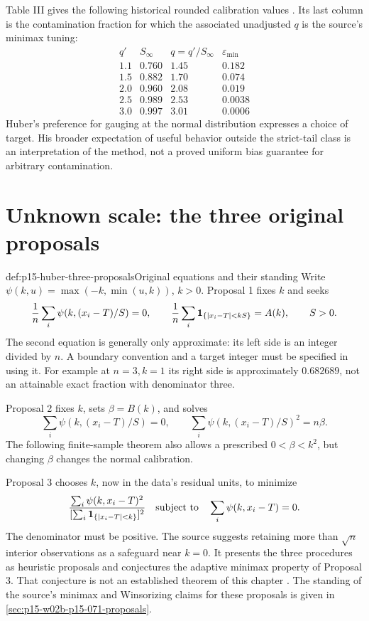 Table III gives the following historical rounded calibration values
\cite[p.~95]{Huber1964RobustLocation}. Its last column is the
contamination fraction for which the associated unadjusted \(q\)
is the source's minimax tuning:
\[
\begin{array}{c|rrr}
q'&S_\infty&q=q'/S_\infty&\varepsilon_{\min}\\\hline
1.1&0.760&1.45&0.182\\
1.5&0.882&1.70&0.074\\
2.0&0.960&2.08&0.019\\
2.5&0.989&2.53&0.0038\\
3.0&0.997&3.01&0.0006
\end{array}
\]
Huber's preference for gauging at the normal distribution expresses
a choice of target. His broader expectation of useful behavior
outside the strict-tail class is an interpretation of the method,
not a proved uniform bias guarantee for arbitrary contamination.

\section{Unknown scale: the three original proposals}
\label{sec:p15-huber-joint-proposals}

\begin{hbmethod}{def:p15-huber-three-proposals}{Original equations and their standing}
Write \(\psi(k,u)=\max(-k,\min(u,k))\), \(k>0\).
Proposal 1 fixes \(k\) and seeks
\[
 \frac1n\sum_i\psi(k,(x_i-T)/S)=0,\qquad
 \frac1n\sum_i{\bf1}_{\{|x_i-T|<kS\}}=A(k),\qquad S>0.
\]
The second equation is generally only approximate: its left side
is an integer divided by \(n\). A boundary convention and a target
integer must be specified in using it. For example at \(n=3,k=1\)
its right side is approximately \(0.682689\), not an attainable
exact fraction with denominator three.

Proposal 2 fixes \(k\), sets \(\beta=B(k)\), and solves
\[
 \sum_i\psi(k,(x_i-T)/S)=0,\qquad
 \sum_i\psi(k,(x_i-T)/S)^2=n\beta .
\]
The following finite-sample theorem also allows a prescribed
\(0<\beta<k^2\), but changing \(\beta\) changes the normal calibration.

Proposal 3 chooses \(k\), now in the data's residual units, to minimize
\[
 \frac{\sum_i\psi(k,x_i-T)^2}
      {[\sum_i{\bf1}_{\{|x_i-T|<k\}}]^2}
 \quad\hbox{subject to}\quad\sum_i\psi(k,x_i-T)=0.
\]
The denominator must be positive. The source suggests retaining
more than \(\sqrt n\) interior observations as a safeguard near
\(k=0\). It presents the three procedures as heuristic proposals
and conjectures the adaptive minimax property of Proposal 3.
That conjecture is not an established theorem of this chapter
\cite[pp.~96--97]{Huber1964RobustLocation}.
The standing of the source's minimax and Winsorizing claims for these
proposals is given in \cref{sec:p15-w02b-p15-071-proposals}.
\end{hbmethod}


